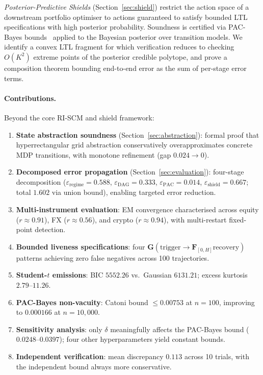 \documentclass[11pt]{article}
\begin{document}
\emph{Posterior-Predictive Shields} (Section~\ref{sec:shield}) restrict
the action space of a downstream portfolio optimiser to actions
guaranteed to satisfy bounded LTL specifications with high posterior
probability.  Soundness is certified via PAC-Bayes
bounds~\cite{mcallester1999pac, catoni2007pac} applied to the Bayesian
posterior over transition models.  We identify a convex LTL fragment for
which verification reduces to checking $O(K^2)$ extreme points of the
posterior credible polytope, and prove a composition theorem bounding
end-to-end error as the sum of per-stage error terms.

\paragraph{Contributions.}
Beyond the core RI-SCM and shield framework:

\begin{enumerate}[nosep]
  \item \textbf{State abstraction soundness}
        (Section~\ref{sec:abstraction}): formal proof that
        hyperrectangular grid abstraction conservatively
        overapproximates concrete MDP transitions, with monotone
        refinement (gap $0.024 \to 0$).
  \item \textbf{Decomposed error propagation}
        (Section~\ref{sec:evaluation}): four-stage decomposition
        ($\varepsilon_{\mathrm{regime}}{=}0.588$,
        $\varepsilon_{\mathrm{DAG}}{=}0.333$,
        $\varepsilon_{\mathrm{PAC}}{=}0.014$,
        $\varepsilon_{\mathrm{shield}}{=}0.667$; total $1.602$
        via union bound), enabling targeted error reduction.
  \item \textbf{Multi-instrument evaluation}: EM convergence
        characterised across equity ($r{\approx}0.91$), FX
        ($r{\approx}0.56$), and crypto ($r{\approx}0.94$), with
        multi-restart fixed-point detection.
  \item \textbf{Bounded liveness specifications}: four
        $\mathbf{G}(\text{trigger}{\to}\mathbf{F}_{[0,H]}
        \text{recovery})$ patterns achieving zero false negatives
        across 100 trajectories.
  \item \textbf{Student-$t$ emissions}: BIC $5552.26$ vs.\ Gaussian
        $6131.21$; excess kurtosis $2.79$--$11.26$.
  \item \textbf{PAC-Bayes non-vacuity}: Catoni bound $\leq 0.00753$
        at $n{=}100$, improving to $0.000166$ at $n{=}10{,}000$.
  \item \textbf{Sensitivity analysis}: only $\delta$ meaningfully
        affects the PAC-Bayes bound ($0.0248$--$0.0397$); four other
        hyperparameters yield constant bounds.
  \item \textbf{Independent verification}: mean discrepancy $0.113$
        across 10 trials, with the independent bound always more
        conservative.
\end{enumerate}
\end{document}
